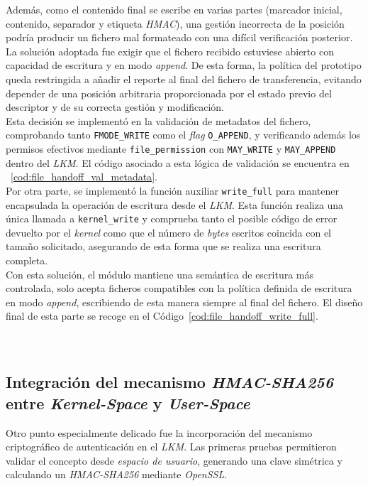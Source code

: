Además, como el contenido final se escribe en varias partes (marcador inicial, contenido, separador y etiqueta \textit{HMAC}), una gestión incorrecta de la posición podría producir un fichero mal formateado con una difícil verificación posterior.\\

La solución adoptada fue exigir que el fichero recibido estuviese abierto con capacidad de escritura y en modo \textit{append}.
De esta forma, la política del prototipo queda restringida a añadir el reporte al final del fichero de transferencia, evitando depender de una posición arbitraria proporcionada por el estado previo del descriptor y de su correcta gestión y modificación.\\

Esta decisión se implementó en la validación de metadatos del fichero, comprobando tanto \verb|FMODE_WRITE| como el \textit{flag} \verb|O_APPEND|, y verificando además los permisos efectivos mediante \verb|file_permission| con \verb|MAY_WRITE| y \verb|MAY_APPEND| dentro del \textit{LKM}.
El código asociado a esta lógica de validación se encuentra en ~\ref{cod:file_handoff_val_metadata}.\\

Por otra parte, se implementó la función auxiliar \verb|write_full| para mantener encapsulada la operación de escritura desde el \textit{LKM}.
Esta función realiza una única llamada a \verb|kernel_write| y comprueba tanto el posible código de error devuelto por el \textit{kernel} como que el número de \textit{bytes} escritos coincida con el tamaño solicitado, asegurando de esta forma que se realiza una escritura completa.\\

Con esta solución, el módulo mantiene una semántica de escritura más controlada, solo acepta ficheros compatibles con la política definida de escritura en modo \textit{append}, escribiendo de esta manera siempre al final del fichero.
El diseño final de esta parte se recoge en el Código~\ref{cod:file_handoff_write_full}.\\\\

\

\subsection{Integración del mecanismo \textit{HMAC-SHA256} entre \textit{Kernel-Space} y \textit{User-Space}}

Otro punto especialmente delicado fue la incorporación del mecanismo criptográfico de autenticación en el \textit{LKM}.
Las primeras pruebas permitieron validar el concepto desde \textit{espacio de usuario}, generando una clave simétrica y calculando un \textit{HMAC-SHA256} mediante \textit{OpenSSL}.\\

